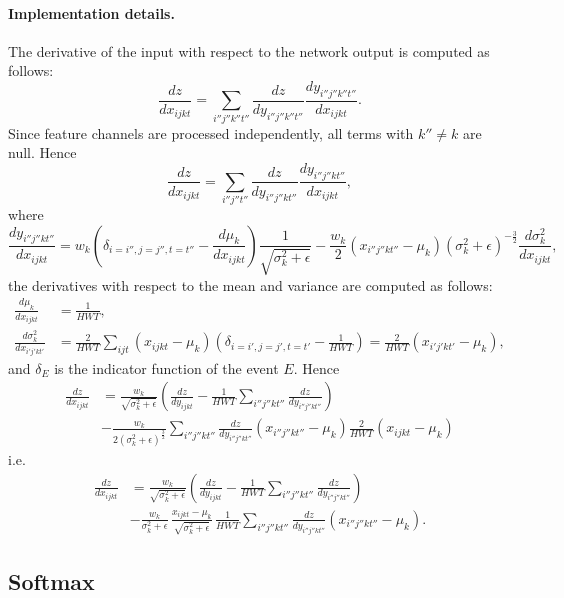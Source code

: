 \documentclass[12pt]{article}
\begin{document}
\paragraph{Implementation details.} The derivative of the input with respect to the network output is computed as follows:
\[
\frac{dz}{dx_{ijkt}} = \sum_{i''j''k''t''}
\frac{dz}{d y_{i''j''k''t''}} 
\frac{d y_{i''j''k''t''}}{d x_{ijkt}}.
\]
Since feature channels are processed independently, all terms with $k''\not=k$ are null. Hence
\[
\frac{dz}{dx_{ijkt}} = \sum_{i''j''t''}
\frac{dz}{d y_{i''j''kt''}} 
\frac{d y_{i''j''kt''}}{d x_{ijkt}},
\]
where
\[
\frac{d y_{i''j''kt''}}{d x_{ijkt}} 
=
w_k
\left(\delta_{i=i'',j=j'',t=t''} - \frac{d \mu_k}{d x_{ijkt}}\right)
\frac{1}{\sqrt{\sigma^2_k + \epsilon}}
-
\frac{w_k}{2}
\left(x_{i''j''kt''} - \mu_k\right)
\left(\sigma_k^2 + \epsilon \right)^{-\frac{3}{2}}
\frac{d \sigma_k^2}{d x_{ijkt}},
\]
the derivatives with respect to the mean and variance are computed as follows:
\begin{align*}
\frac{d \mu_k}{d x_{ijkt}} &= \frac{1}{HWT},
\\
\frac{d \sigma_k^2}{d x_{i'j'kt'}}
&=
\frac{2}{HWT}
\sum_{ijt}
\left(x_{ijkt} - \mu_k \right)
\left(\delta_{i=i',j=j',t=t'} - \frac{1}{HWT} \right)
=
\frac{2}{HWT} \left(x_{i'j'kt'} - \mu_k \right),
\end{align*}
and $\delta_E$ is the indicator function of the event $E$. Hence
\begin{align*}
\frac{dz}{dx_{ijkt}}
&=
\frac{w_k}{\sqrt{\sigma^2_k + \epsilon}}
\left(
\frac{dz}{d y_{ijkt}} 
-
\frac{1}{HWT}\sum_{i''j''kt''}
\frac{dz}{d y_{i''j''kt''}} 
\right)
\\
&-
\frac{w_k}{2(\sigma^2_k + \epsilon)^{\frac{3}{2}}}
\sum_{i''j''kt''}
\frac{dz}{d y_{i''j''kt''}} 
\left(x_{i''j''kt''} - \mu_k\right)
\frac{2}{HWT} \left(x_{ijkt} - \mu_k \right)
\end{align*}
i.e.
\begin{align*}
\frac{dz}{dx_{ijkt}}
&=
\frac{w_k}{\sqrt{\sigma^2_k + \epsilon}}
\left(
\frac{dz}{d y_{ijkt}} 
-
\frac{1}{HWT}\sum_{i''j''kt''}
\frac{dz}{d y_{i''j''kt''}} 
\right)
\\
&-
\frac{w_k}{\sigma^2_k + \epsilon}
\,
\frac{x_{ijkt} - \mu_k}{\sqrt{\sigma^2_k + \epsilon}}
\,
\frac{1}{HWT}
\sum_{i''j''kt''}
\frac{dz}{d y_{i''j''kt''}} 
\left(x_{i''j''kt''} - \mu_k\right).
\end{align*}

\subsection{Softmax}\label{s:softmax}
\end{document}
